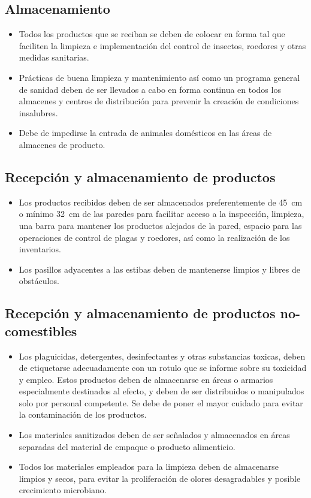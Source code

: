 \subsection{Almacenamiento}
\begin{itemize}
	\item Todos los productos que se reciban se deben de colocar en forma tal que faciliten la limpieza e implementación del control de insectos, roedores y otras medidas sanitarias.
	\item Prácticas de buena limpieza y mantenimiento así como un programa general de sanidad deben de ser llevados a cabo en forma continua en todos los almacenes y centros de distribución para prevenir la creación de condiciones insalubres.
	\item Debe de impedirse la entrada de animales domésticos en las áreas de almacenes de producto.
\end{itemize}

\subsection{Recepción y almacenamiento de productos}
\begin{itemize}
	\item Los productos recibidos deben de ser almacenados preferentemente de \SI{45}{\centi\meter} o mínimo \SI{32}{\centi\meter} de las paredes para facilitar acceso a la inspección, limpieza, una barra para mantener los productos alejados de la pared, espacio para las operaciones de control de plagas y roedores, así como la realización de los inventarios.
	\item Los pasillos adyacentes a las estibas deben de mantenerse limpios y libres de obstáculos.
\end{itemize}

\subsection{Recepción y almacenamiento de productos no-comestibles}
\begin{itemize}
	\item Los plaguicidas, detergentes, desinfectantes y otras substancias toxicas, deben de etiquetarse adecuadamente con un rotulo que se informe sobre su toxicidad y empleo. Estos productos deben de almacenarse en áreas o armarios especialmente destinados al efecto, y deben de ser distribuidos o manipulados solo por personal competente. Se debe de poner el mayor cuidado para evitar la contaminación de los productos.
	\item Los materiales sanitizados deben de ser señalados y almacenados en áreas separadas del material de empaque o producto alimenticio.
	\item Todos los materiales empleados para la limpieza deben de almacenarse limpios y secos, para evitar la proliferación de olores desagradables y posible crecimiento microbiano.
\end{itemize}

